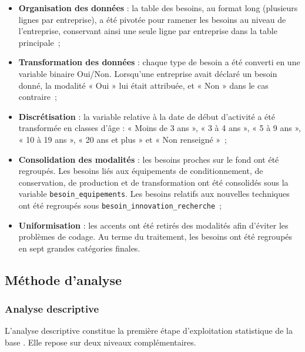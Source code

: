 \documentclass[12pt, a4paper, oneside]{report}
\begin{document}
\begin{itemize}
  \item \textbf{Organisation des données} : la table des besoins, au format long (plusieurs lignes par entreprise), a été pivotée pour ramener les besoins au niveau de l'entreprise, conservant ainsi une seule ligne par entreprise dans la table principale~;

  \item \textbf{Transformation des données} : chaque type de besoin a été converti en une variable binaire Oui/Non. Lorsqu'une entreprise avait déclaré un besoin donné, la modalité « Oui » lui était attribuée, et « Non » dans le cas contraire~;

  \item \textbf{Discrétisation} : la variable relative à la date de début d'activité a été transformée en classes d'âge : « Moins de 3 ans », « 3 à 4 ans », « 5 à 9 ans », « 10 à 19 ans », « 20 ans et plus » et « Non renseigné »~;

  \item \textbf{Consolidation des modalités} : les besoins proches sur le fond ont été regroupés. Les besoins liés aux équipements de conditionnement, de conservation, de production et de transformation ont été consolidés sous la variable \texttt{besoin\_equipements}. Les besoins relatifs aux nouvelles techniques ont été regroupés sous \texttt{besoin\_innovation\_recherche}~;

  \item \textbf{Uniformisation} : les accents ont été retirés des modalités afin d'éviter les problèmes de codage. Au terme du traitement, les besoins ont été regroupés en sept grandes catégories finales.
\end{itemize}

\subsection{Méthode d'analyse}

\subsubsection{Analyse descriptive}

L'analyse descriptive constitue la première étape d'exploitation statistique de la base \cite{saporta2010}. Elle repose sur deux niveaux complémentaires.
\end{document}
